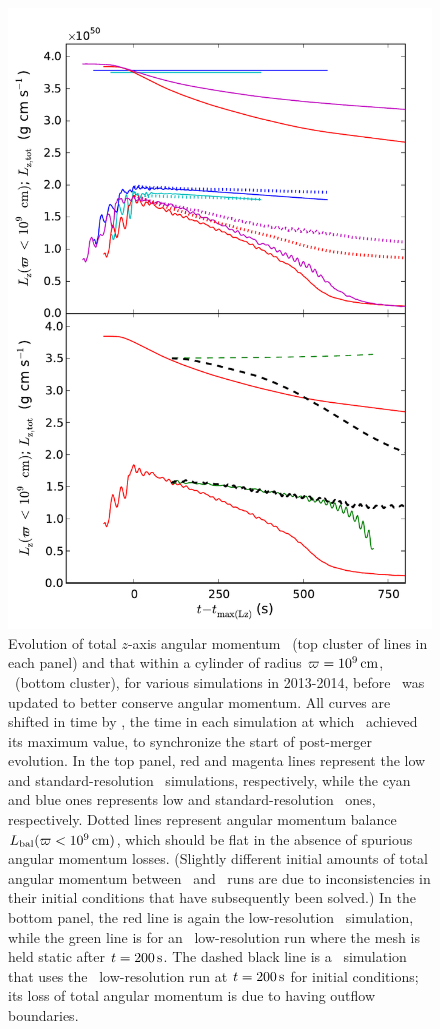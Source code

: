 \begin{figure}
\centering
\includegraphics[angle=0,width=0.6\columnwidth]{chapter3_zhu+u/figures/lz_development.pdf}
\caption{Evolution of total $z$-axis angular momentum \Lztot\ (top cluster of lines in each panel) and that within a cylinder of radius $\varpi = 10^9\,\mathrm{cm}$, \Lzinner\ (bottom cluster), for various simulations in 2013-2014, before \arepo\ was updated to better conserve angular momentum.  All curves are shifted in time by \tlm, the time in each simulation at which \Lzinner\ achieved its maximum value, to synchronize the start of post-merger evolution.  In the top panel, red and magenta lines represent the low and standard-resolution \arepo\ simulations, respectively, while the cyan and blue ones represents low and standard-resolution \gasoline\ ones, respectively.  Dotted lines represent angular momentum balance $\Lbal(\winnercyl)$, which should be flat in the absence of spurious angular momentum losses.  (Slightly different initial amounts of total angular momentum between \arepo\ and \gasoline\ runs are due to inconsistencies in their initial conditions that have subsequently been solved.)  In the bottom panel, the red line is again the low-resolution \arepo\ simulation, while the green line is for an \arepo\ low-resolution run where the mesh is held static after $t = 200\,\mathrm{s}$.  The dashed black line is a \flash\ simulation that uses the \arepo\ low-resolution run at $t = 200\,\mathrm{s}$ for initial conditions; its loss of total angular momentum is due to having outflow boundaries.}
\label{fig:c3_fix_angmo}
\end{figure}

